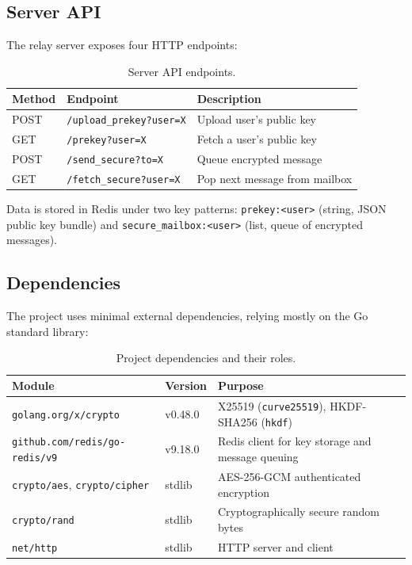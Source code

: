 \documentclass[12pt,a4paper]{article}
\begin{document}
\subsection{Server API}

The relay server exposes four HTTP endpoints:

\begin{table}[H]
\centering
\begin{tabular}{l l p{6cm}}
\toprule
\textbf{Method} & \textbf{Endpoint} & \textbf{Description} \\
\midrule
POST & \texttt{/upload\_prekey?user=X} & Upload user's public key \\
GET  & \texttt{/prekey?user=X} & Fetch a user's public key \\
POST & \texttt{/send\_secure?to=X} & Queue encrypted message \\
GET  & \texttt{/fetch\_secure?user=X} & Pop next message from mailbox \\
\bottomrule
\end{tabular}
\caption{Server API endpoints.}
\end{table}

Data is stored in Redis under two key patterns: \texttt{prekey:<user>} (string, JSON public key bundle) and \texttt{secure\_mailbox:<user>} (list, queue of encrypted messages).

\subsection{Dependencies}

The project uses minimal external dependencies, relying mostly on the Go standard library:

\begin{table}[H]
\centering
\begin{tabular}{l l p{6.5cm}}
\toprule
\textbf{Module} & \textbf{Version} & \textbf{Purpose} \\
\midrule
\texttt{golang.org/x/crypto} & v0.48.0 & X25519 (\texttt{curve25519}), HKDF-SHA256 (\texttt{hkdf}) \\
\texttt{github.com/redis/go-redis/v9} & v9.18.0 & Redis client for key storage and message queuing \\
\texttt{crypto/aes}, \texttt{crypto/cipher} & stdlib & AES-256-GCM authenticated encryption \\
\texttt{crypto/rand} & stdlib & Cryptographically secure random bytes \\
\texttt{net/http} & stdlib & HTTP server and client \\
\bottomrule
\end{tabular}
\caption{Project dependencies and their roles.}
\end{table}
\end{document}
